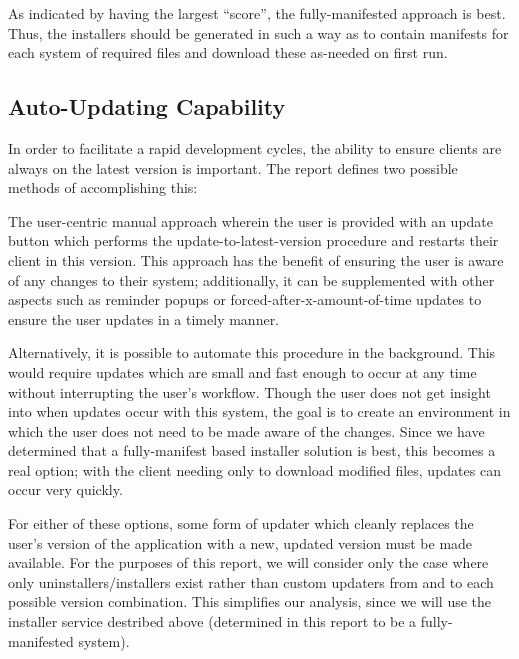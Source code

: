 \documentclass[12pt]{article}
\begin{document}
As indicated by having the largest ``score'', the fully-manifested approach is best. Thus, the installers should be generated in such a way as to contain manifests for each system of required files and download these as-needed on first run.

\subsection{Auto-Updating Capability}
In order to facilitate a rapid development cycles, the ability to ensure clients are always on the latest version is important. The report defines two possible methods of accomplishing this:

The user-centric manual approach wherein the user is provided with an update button which performs the update-to-latest-version procedure and restarts their client in this version. This approach has the benefit of ensuring the user is aware of any changes to their system; additionally, it can be supplemented with other aspects such as reminder popups or forced-after-x-amount-of-time updates to ensure the user updates in a timely manner.

Alternatively, it is possible to automate this procedure in the background. This would require updates which are small and fast enough to occur at any time without interrupting the user's workflow. Though the user does not get insight into when updates occur with this system, the goal is to create an environment in which the user does not need to be made aware of the changes. Since we have determined that a fully-manifest based installer solution is best, this becomes a real option; with the client needing only to download modified files, updates can occur very quickly.

For either of these options, some form of updater which cleanly replaces the user's version of the application with a new, updated version must be made available. For the purposes of this report, we will consider only the case where only uninstallers/installers exist rather than custom updaters from and to each possible version combination. This simplifies our analysis, since we will use the installer service destribed above (determined in this report to be a fully-manifested system).
\end{document}
